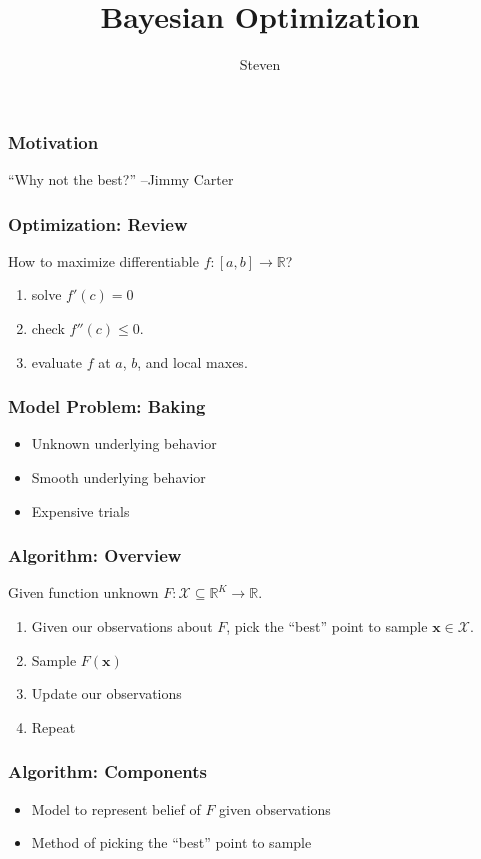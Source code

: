 \documentclass[draft]{beamer}
\title{Bayesian Optimization}
\author{Steven}
\begin{document}
\begin{frame}
    \titlepage
\end{frame}

\begin{frame}
    \frametitle{Motivation}
    \begin{centering}
        ``Why not the best?'' --Jimmy Carter
    \end{centering}
\end{frame}

\begin{frame}
    \frametitle{Optimization: Review}
    How to maximize differentiable $f:[a, b] \to \mathbb{R}$?
    \begin{enumerate}
        \item solve $f'(c) = 0$
            \pause
        \item check $f''(c) \leq 0$.
            \pause
        \item evaluate $f$ at $a$, $b$, and local maxes.
    \end{enumerate}
\end{frame}

\begin{frame}
    \frametitle{Model Problem: Baking}
    \begin{itemize}
        \item Unknown underlying behavior
            \pause
        \item Smooth underlying behavior
            \pause
        \item Expensive trials
            \pause
    \end{itemize}
\end{frame}

\begin{frame}
    \frametitle{Algorithm: Overview}
    Given function unknown $F: \mathcal{X} \subseteq \mathbb{R}^{K} \to \mathbb{R}$.
    \begin{enumerate}
        \item Given our observations about $F$, pick the ``best'' point to sample $\mathbf{x} \in \mathcal{X}$.
            \pause
        \item Sample $F(\mathbf{x})$
            \pause
        \item Update our observations
            \pause
        \item Repeat
    \end{enumerate}
\end{frame}

\begin{frame}
    \frametitle{Algorithm: Components}
    \begin{itemize}
        \item Model to represent belief of $F$ given observations
            \pause
        \item Method of picking the ``best'' point to sample
    \end{itemize}
\end{frame}
\end{document}
